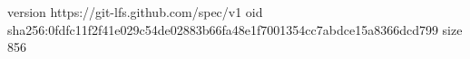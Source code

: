 version https://git-lfs.github.com/spec/v1
oid sha256:0fdfc11f2f41e029c54de02883b66fa48e1f7001354cc7abdce15a8366dcd799
size 856

